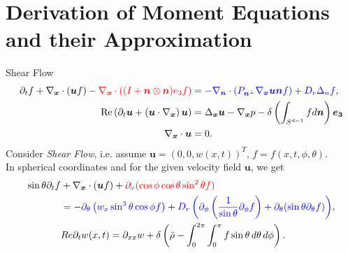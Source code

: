 \section{Derivation of Moment Equations and their Approximation}

\begin{frame}{Shear Flow}
	\scriptsize
	\begin{align*}
		\partial_t f+ \nabla_{\boldsymbol{x}} \cdot(\boldsymbol{u} f) -\textcolor{red}{\nabla_{\boldsymbol{x}} \cdot\left((I+\boldsymbol{n} \otimes \boldsymbol{n}) e_3 f\right)}  &= -\textcolor{blue}{\nabla_{\boldsymbol{n}} \cdot\left(P_{\boldsymbol{n}^{\perp}} \nabla_{\boldsymbol{x}} \boldsymbol{u} \boldsymbol{n} f\right)} + \textcolor{blue}{D_r \Delta_n f}\label{SmochEq_kurz}, \\
		\operatorname{Re}\left(\partial_t \boldsymbol{u}+\left(\boldsymbol{u} \cdot \nabla_{\boldsymbol{x}}\right) \boldsymbol{u}\right) & =\Delta_{\boldsymbol{x}} \boldsymbol{u}-\nabla_{\boldsymbol{x}} p-\delta \left(\int_{S^{d-1}} f d \boldsymbol{n} \right) \boldsymbol{e_3} \\
		\nabla_{\boldsymbol{x}} \cdot \boldsymbol{u} & =0.
	\end{align*}
	Consider \textit{Shear Flow}, i.e. assume $	\boldsymbol{u} = (0,0,w(x,t))^T$, $f=f(x,t,\phi,\theta)$. \\
	\vspace{3mm}
	\pause
	In spherical coordinates and for the given velocity field $\boldsymbol{u}$, we get
	\begin{equation}
		\begin{aligned}
			\sin\theta \partial_{t}f & + \nabla_{\boldsymbol{x}} \cdot(\boldsymbol{u} f) + \textcolor{red}{\partial_x (\cos\phi \cos\theta \sin^2\theta f)} \\
			&= - \textcolor{blue}{\partial_\theta \left(w_x \sin^3 \theta \cos \phi f\right)} + \textcolor{blue}{D_{r} \left( \partial_\phi \left(\frac{1}{\sin \theta} \partial_\phi f \right) + \partial_\theta (\sin \theta \partial_\theta f) \right)}, \\
			& Re \partial_{t}w(x,t) = \partial_{xx}w + \delta \left( \bar{\rho} - \int_{0}^{2\pi} \int_{0}^{\pi} f \sin \theta \, d\theta \, d\phi \right). \label{SmochEq_wx}
		\end{aligned}
	\end{equation}
\end{frame}

